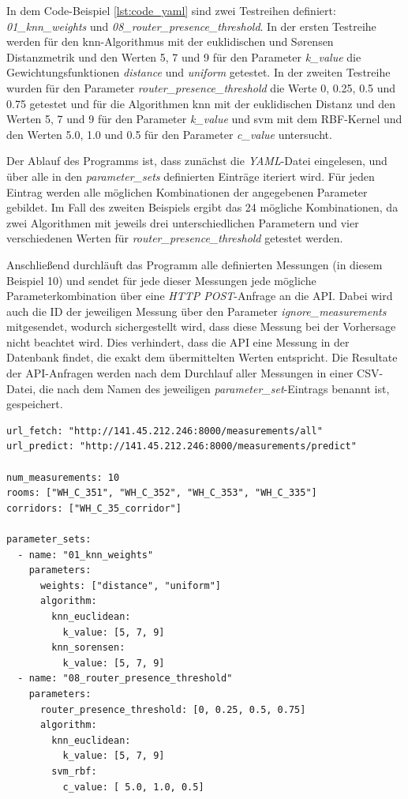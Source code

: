 In dem Code-Beispiel \ref{lst:code_yaml} sind zwei Testreihen definiert: \textit{01\_knn\_weights} und \textit{08\allowbreak\_router\allowbreak\_pre\-sence\allowbreak\_threshold}. In der ersten Testreihe werden für den \gls{knn}-Algorithmus mit der euklidischen und Sørensen Distanzmetrik und den Werten 5, 7 und 9 für den Parameter \textit{k\_value} die Gewichtungsfunktionen \textit{distance} und \textit{uniform} getestet. In der zweiten Testreihe wurden für den Parameter \textit{router\_presence\_threshold} die Werte 0, 0.25, 0.5 und 0.75 getestet und für die Algorithmen \gls{knn} mit der euklidischen Distanz und den Werten 5, 7 und 9 für den Parameter \textit{k\_value} und \gls{svm} mit dem RBF-Kernel und den Werten 5.0, 1.0 und 0.5 für den Parameter \textit{c\_value} untersucht.

Der Ablauf des Programms ist, dass zunächst die \textit{YAML}-Datei eingelesen, und über alle in den \textit{parameter\_sets} definierten Einträge iteriert wird. Für jeden Eintrag werden alle möglichen Kombinationen der angegebenen Parameter gebildet. Im Fall des zweiten Beispiels ergibt das 24 mögliche Kombinationen, da zwei Algorithmen mit jeweils drei unterschiedlichen Parametern und vier verschiedenen Werten für \textit{router\_presence\_threshold} getestet werden.

Anschließend durchläuft das Programm alle definierten Messungen (in diesem Beispiel 10) und sendet für jede dieser Messungen jede mögliche Parameterkombination über eine \textit{HTTP POST}-Anfrage an die API. Dabei wird auch die ID der jeweiligen Messung über den Parameter \textit{ignore\_measurements} mitgesendet, wodurch sichergestellt wird, dass diese Messung bei der Vorhersage nicht beachtet wird. Dies verhindert, dass die API eine Messung in der Datenbank findet, die exakt dem übermittelten Werten entspricht. Die Resultate der API-Anfragen werden nach dem Durchlauf aller Messungen in einer CSV-Datei, die nach dem Namen des jeweiligen \textit{parameter\_set}-Eintrags benannt ist, gespeichert.

\begin{lstlisting}[caption=\textit{YAML}-Konfigurationsdatei der Testanwendung, label={lst:code_yaml}]
url_fetch: "http://141.45.212.246:8000/measurements/all"
url_predict: "http://141.45.212.246:8000/measurements/predict"

num_measurements: 10
rooms: ["WH_C_351", "WH_C_352", "WH_C_353", "WH_C_335"]
corridors: ["WH_C_35_corridor"]

parameter_sets:
  - name: "01_knn_weights"
    parameters:
      weights: ["distance", "uniform"]
      algorithm:
        knn_euclidean:
          k_value: [5, 7, 9]
        knn_sorensen:
          k_value: [5, 7, 9]
  - name: "08_router_presence_threshold"
    parameters:
      router_presence_threshold: [0, 0.25, 0.5, 0.75]
      algorithm:
        knn_euclidean:
          k_value: [5, 7, 9]
        svm_rbf:
          c_value: [ 5.0, 1.0, 0.5]
\end{lstlisting}

